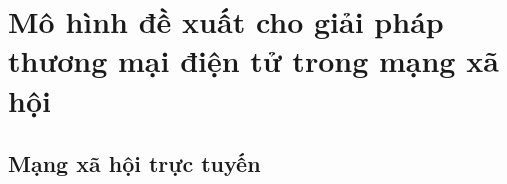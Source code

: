 \chapter{Mô hình đề xuất cho giải pháp thương mại điện tử trong mạng xã hội}

\section{Mạng xã hội trực tuyến}
